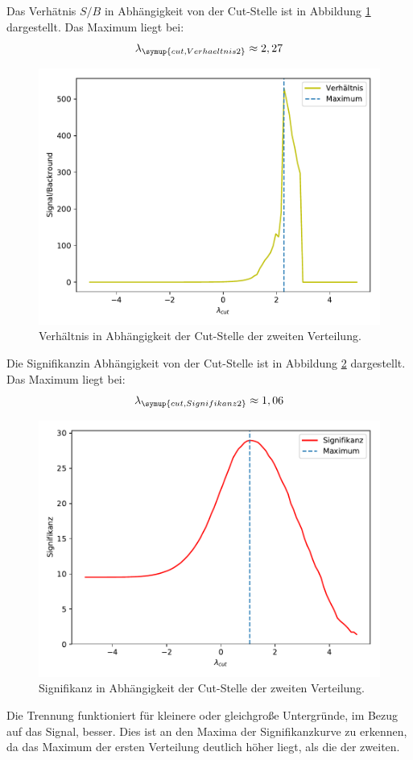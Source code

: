 Das Verhätnis $S/B$ in Abhängigkeit von der Cut-Stelle ist in Abbildung \ref{abb:7} dargestellt.
Das Maximum liegt bei:
\begin{equation*}
  \lambda_{\symup{cut,Verhaeltnis2}} \approx 2,27
\end{equation*}
\begin{figure}
  \centering
  \includegraphics[scale=0.7]{Aufgabe12/Verhaeltnis2.pdf}
  \caption{Verhältnis in Abhängigkeit der Cut-Stelle der zweiten Verteilung.}
  \label{abb:7}
\end{figure}

Die Signifikanzin Abhängigkeit von der Cut-Stelle ist in Abbildung \ref{abb:8} dargestellt.
Das Maximum liegt bei:
\begin{equation*}
  \lambda_{\symup{cut,Signifikanz2}} \approx 1,06
\end{equation*}
\begin{figure}
  \centering
  \includegraphics[scale=0.7]{Aufgabe12/Signifikanz2.pdf}
  \caption{Signifikanz in Abhängigkeit der Cut-Stelle der zweiten Verteilung.}
  \label{abb:8}
\end{figure}

Die Trennung funktioniert für kleinere oder gleichgroße Untergründe, im Bezug auf
das Signal, besser. Dies ist an den Maxima der Signifikanzkurve zu erkennen, da
das Maximum der ersten Verteilung deutlich höher liegt, als die der zweiten.
